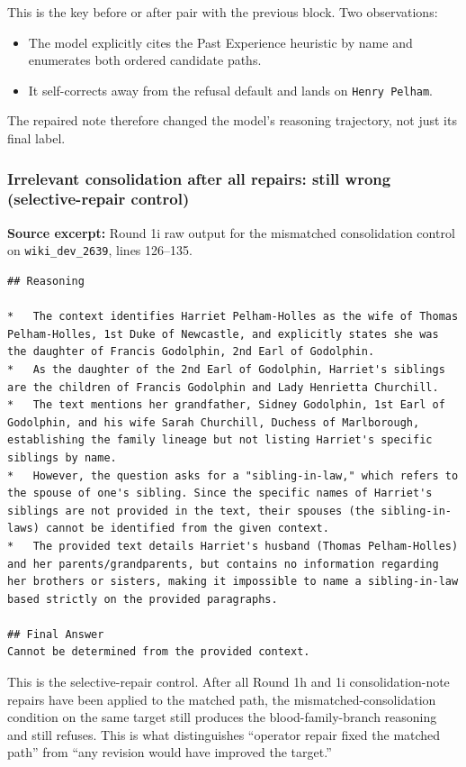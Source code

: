 This is the key before or after pair with the previous block. Two observations:

\begin{itemize}
\item The model explicitly cites the Past Experience heuristic by name and enumerates both ordered candidate paths.
\item It self-corrects away from the refusal default and lands on \texttt{Henry Pelham}.
\end{itemize}

The repaired note therefore changed the model's reasoning trajectory, not just its final label.

\subsubsection{Irrelevant consolidation after all repairs: still wrong (selective-repair control)}

\textbf{Source excerpt:} Round 1i raw output for the mismatched consolidation control on \texttt{wiki\_dev\_2639}, lines 126--135.

\begin{lstlisting}
## Reasoning

*   The context identifies Harriet Pelham-Holles as the wife of Thomas Pelham-Holles, 1st Duke of Newcastle, and explicitly states she was the daughter of Francis Godolphin, 2nd Earl of Godolphin.
*   As the daughter of the 2nd Earl of Godolphin, Harriet's siblings are the children of Francis Godolphin and Lady Henrietta Churchill.
*   The text mentions her grandfather, Sidney Godolphin, 1st Earl of Godolphin, and his wife Sarah Churchill, Duchess of Marlborough, establishing the family lineage but not listing Harriet's specific siblings by name.
*   However, the question asks for a "sibling-in-law," which refers to the spouse of one's sibling. Since the specific names of Harriet's siblings are not provided in the text, their spouses (the sibling-in-laws) cannot be identified from the given context.
*   The provided text details Harriet's husband (Thomas Pelham-Holles) and her parents/grandparents, but contains no information regarding her brothers or sisters, making it impossible to name a sibling-in-law based strictly on the provided paragraphs.

## Final Answer
Cannot be determined from the provided context.
\end{lstlisting}

This is the selective-repair control. After all Round 1h and 1i consolidation-note repairs have been applied to the matched path, the mismatched-consolidation condition on the same target still produces the blood-family-branch reasoning and still refuses. This is what distinguishes ``operator repair fixed the matched path'' from ``any revision would have improved the target.''

